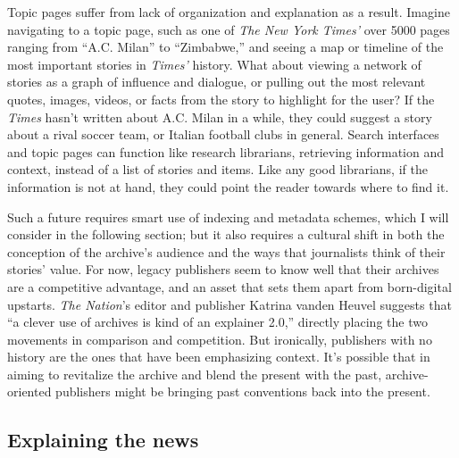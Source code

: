 Topic pages suffer from lack of organization and explanation as a result. Imagine navigating to a topic page, such as one of \emph{The New York Times'} over 5000 pages ranging from ``A.C. Milan'' to ``Zimbabwe,'' and seeing a map or timeline of the most important stories in \emph{Times'} history. What about viewing a network of stories as a graph of influence and dialogue, or pulling out the most relevant quotes, images, videos, or facts from the story to highlight for the user? If the \emph{Times} hasn't written about A.C. Milan in a while, they could suggest a story about a rival soccer team, or Italian football clubs in general. Search interfaces and topic pages can function like research librarians, retrieving information and context, instead of a list of stories and items. Like any good librarians, if the information is not at hand, they could point the reader towards where to find it.

Such a future requires smart use of indexing and metadata schemes, which I will consider in the following section; but it also requires a cultural shift in both the conception of the archive's audience and the ways that journalists think of their stories' value. For now, legacy publishers seem to know well that their archives are a competitive advantage, and an asset that sets them apart from born-digital upstarts. \emph{The Nation}'s editor and publisher Katrina vanden Heuvel suggests that ``a clever use of archives is kind of an explainer 2.0,'' directly placing the two movements in comparison and competition.\autocite{levy_time.com_2014} But ironically, publishers with no history are the ones that have been emphasizing context. It's possible that in aiming to revitalize the archive and blend the present with the past, archive-oriented publishers might be bringing past conventions back into the present.

\subsection{Explaining the news}


